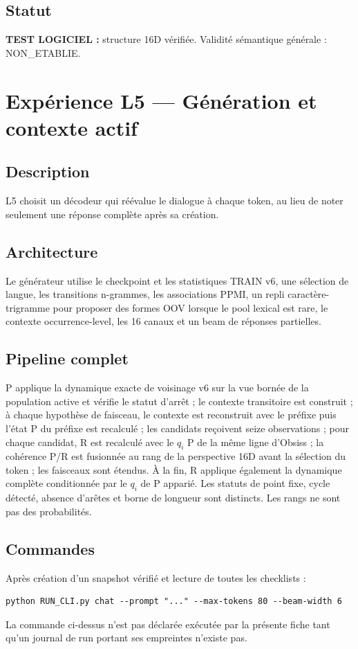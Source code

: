 \documentclass[11pt,a4paper]{report}
\begin{document}
\section{Statut}
\textbf{TEST LOGICIEL :} structure 16D vérifiée. Validité sémantique générale : NON\_ETABLIE.

\chapter{Expérience L5 — Génération et contexte actif}
\section{Description}
L5 choisit un décodeur qui réévalue le dialogue à chaque token, au lieu de noter seulement une réponse complète après sa création.
\section{Architecture}
Le générateur utilise le checkpoint et les statistiques TRAIN v6, une sélection de langue, les transitions n-grammes, les associations PPMI, un repli caractère-trigramme pour proposer des formes OOV lorsque le pool lexical est rare, le contexte occurrence-level, les 16 canaux et un beam de réponses partielles.
\section{Pipeline complet}
P applique la dynamique exacte de voisinage v6 sur la vue bornée de la population active et vérifie le statut d'arrêt ; le contexte transitoire est construit ; à chaque hypothèse de faisceau, le contexte est reconstruit avec le préfixe puis l'état P du préfixe est recalculé ; les candidats reçoivent seize observations ; pour chaque candidat, R est recalculé avec le $q_i$ P de la même ligne d'Obsiss ; la cohérence P/R est fusionnée au rang de la perspective 16D avant la sélection du token ; les faisceaux sont étendus. À la fin, R applique également la dynamique complète conditionnée par le $q_i$ de P apparié. Les statuts de point fixe, cycle détecté, absence d'arêtes et borne de longueur sont distincts. Les rangs ne sont pas des probabilités.
\section{Commandes}
Après création d'un snapshot vérifié et lecture de toutes les checklists :
\begin{verbatim}
python RUN_CLI.py chat --prompt "..." --max-tokens 80 --beam-width 6
\end{verbatim}
La commande ci-dessus n'est pas déclarée exécutée par la présente fiche tant qu'un journal de run portant ses empreintes n'existe pas.
\end{document}
